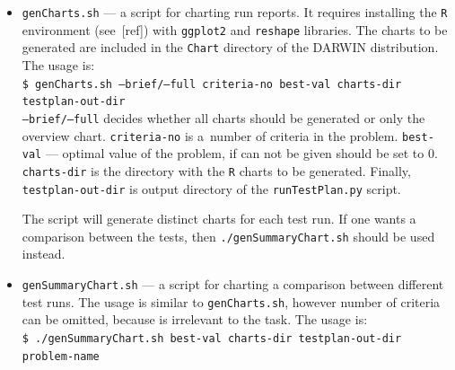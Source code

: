 \begin{itemize}
\item \texttt{genCharts.sh} --- a script for charting run reports. It requires
  installing the \texttt{R} environment (see~[ref]) with \texttt{ggplot2} and
  \texttt{reshape} libraries. The charts to be generated are included in the
  \texttt{Chart} directory of the DARWIN distribution. The usage is: \\
  \texttt{\$ genCharts.sh --brief/--full criteria-no best-val charts-dir
    testplan-out-dir} \\
  \texttt{--brief/--full} decides whether all charts should be generated or
  only the overview chart. \texttt{criteria-no} is a~number of criteria in the
  problem. \texttt{best-val} --- optimal value of the problem, if can not be
  given should be set to $0$. \texttt{charts-dir} is the directory with the
  \texttt{R} charts to be generated. Finally, \texttt{testplan-out-dir} is
  output directory of the \texttt{runTestPlan.py} script.

  The script will generate distinct charts for each test run. If one wants a
  comparison between the tests, then \texttt{./genSummaryChart.sh} should be
  used instead.

\item \texttt{genSummaryChart.sh} --- a script for charting a comparison
  between different test runs. The usage is similar to \texttt{genCharts.sh},
  however number of criteria can be omitted, because is irrelevant to the
  task. The usage is: \\
  \texttt{\$ ./genSummaryChart.sh best-val charts-dir testplan-out-dir
    problem-name}



\end{itemize}


